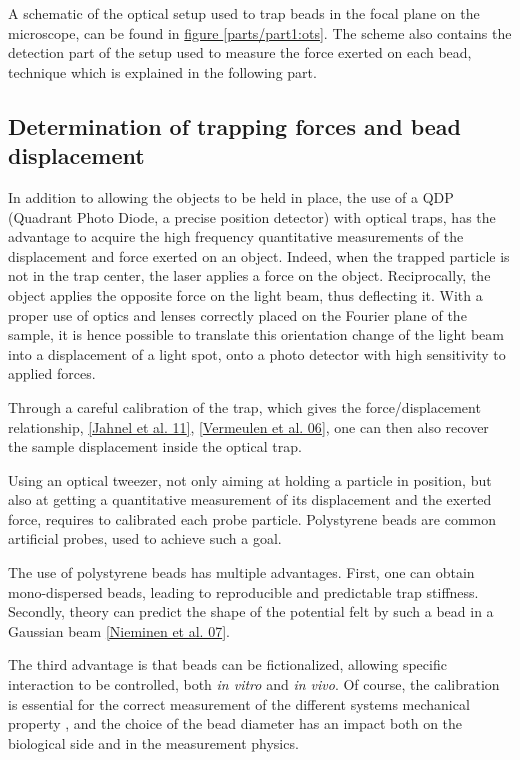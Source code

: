 \documentclass[A4paperpaper,11pt,english]{sphinxmanual}
\begin{document}
A schematic of the optical setup used to trap beads in the focal
plane on the microscope, can be found in \hyperref[parts/part1:ots]{figure  \ref*{parts/part1:ots}}. The scheme also
contains the detection part of the setup used to measure the force
exerted on each bead, technique which is explained in the following part.


\subsection{Determination of trapping forces and bead displacement}
\label{parts/part1:determination-of-trapping-forces-and-bead-displacement}
In addition to allowing the objects to be held in place, the use of a QDP
(Quadrant Photo Diode, a precise position detector) with optical traps, has the
advantage to acquire the high frequency quantitative measurements of the
displacement and force exerted on an object.  Indeed, when the trapped particle
is not in the trap center, the laser applies a force on the object.
Reciprocally, the object applies the opposite force on the light beam, thus
deflecting it.  With a proper use of optics and lenses correctly placed on the
Fourier plane of the sample, it is hence possible to translate this orientation
change of the light  beam into a displacement of a light spot, onto a photo
detector with high sensitivity to applied forces.

Through a careful calibration of the trap, which gives the force/displacement
relationship, {\hyperref[parts/part1:jahnel2011]{{[}Jahnel et al. 11{]}}}, {\hyperref[parts/part1:vermeulen2006]{{[}Vermeulen et al. 06{]}}}, one can then also
recover the sample displacement inside the optical trap.

Using an optical tweezer, not only aiming at holding a particle in position, but also at getting a
quantitative measurement of its displacement and the exerted force, requires to
calibrated each probe particle. Polystyrene beads are common artificial probes,
used to achieve such a goal.

The use of polystyrene beads has multiple advantages. First, one
can obtain mono-dispersed beads, leading to reproducible and predictable trap
stiffness. Secondly, theory can predict the shape of
the potential felt by such a bead in a Gaussian beam {\hyperref[parts/part1:nieminen2007]{{[}Nieminen et al. 07{]}}}.

The third advantage is that beads can be fictionalized, allowing specific
interaction to be controlled, both \emph{in vitro} and \emph{in vivo}. Of course, the
calibration is essential for the correct measurement of the different systems mechanical property
, and the choice of the bead diameter has an impact both on
the biological side and in the measurement physics.
\label{parts/part2:part2}
\end{document}
